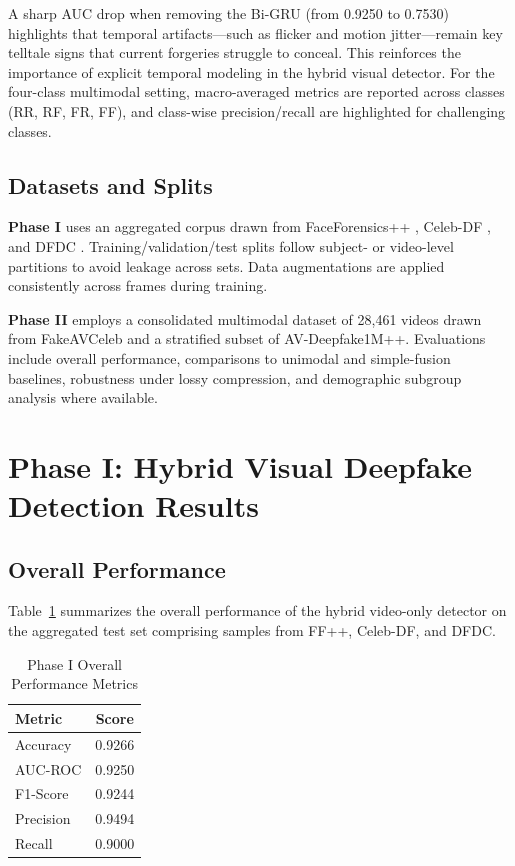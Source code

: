 A sharp AUC drop when removing the Bi-GRU (from 0.9250 to 0.7530) highlights that temporal artifacts—such as flicker and motion jitter—remain key telltale signs that current forgeries struggle to conceal. This reinforces the importance of explicit temporal modeling in the hybrid visual detector.
For the four-class multimodal setting, macro-averaged metrics are reported across classes (RR, RF, FR, FF), and class-wise precision/recall are highlighted for challenging classes.

\subsection{Datasets and Splits}
\textbf{Phase I} uses an aggregated corpus drawn from FaceForensics++ \cite{rossler2019faceforensics}, Celeb-DF \cite{li2020celebdf}, and DFDC \cite{dolhansky2020dfdc}. Training/validation/test splits follow subject- or video-level partitions to avoid leakage across sets. Data augmentations are applied consistently across frames during training.

\textbf{Phase II} employs a consolidated multimodal dataset of 28{,}461 videos drawn from FakeAVCeleb and a stratified subset of AV-Deepfake1M++. Evaluations include overall performance, comparisons to unimodal and simple-fusion baselines, robustness under lossy compression, and demographic subgroup analysis where available.

\section{Phase I: Hybrid Visual Deepfake Detection Results}
\subsection{Overall Performance}
Table~\ref{tab:phase1_overall} summarizes the overall performance of the hybrid video-only detector on the aggregated test set comprising samples from FF++, Celeb-DF, and DFDC.

\begin{table}[!htbp]
\centering
\caption{Phase I Overall Performance Metrics}
\label{tab:phase1_overall}
\begin{tabular}{l c}
\toprule
Metric & Score \\
\midrule
Accuracy & 0.9266 \\
AUC-ROC & 0.9250 \\
F1-Score & 0.9244 \\
Precision & 0.9494 \\
Recall & 0.9000 \\
\bottomrule
\end{tabular}
\end{table}


